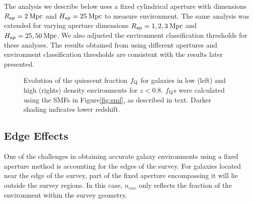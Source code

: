 \documentclass{emulateapj}
\begin{document}
The analysis we describe below uses a fixed cylindrical aperture with dimensions $R_{\rm{ap}} = 2 \: \rm{Mpc}$ and $H_{\rm{ap}} = 25 \: \rm{Mpc}$ to measure environment. The same analysis was extended for varying aperture dimensions $R_{\rm{ap}} = 1, 2, 3 \: \rm{Mpc}$ and $H_{\rm{ap}} = 25, 50 \: \rm{Mpc}$. We also adjusted the environment classification thresholds for these analyses. The results obtained from using different apertures and environment classification thresholds are consistent with the results later presented.  
\begin{figure*}
    \begin{center}
        \leavevmode
        \caption{Evolution of the quiescent fraction $f_{\rm{Q}}$ for galaxies in low (left) and high (rights) density environments for $z < 0.8$. $f_{\rm{Q}}$s were calculated using the SMFs in Figure\ref{fig:smf}, as described in text. Darker shading indicates lower redshift.}         \label{fig:qf}
    \end{center}
\end{figure*}
\subsection{Edge Effects} \label{sec:edgeeffect}
One of the challenges in obtaining accurate galaxy environments using a fixed aperture method is accounting for the edges of the survey. For galaxies located near the edge of the survey, part of the fixed aperture encompassing it will lie outside the survey regions. In this case, $n_{env}$ only reflects the fraction of the environment within the survey geometry.
\end{document}
